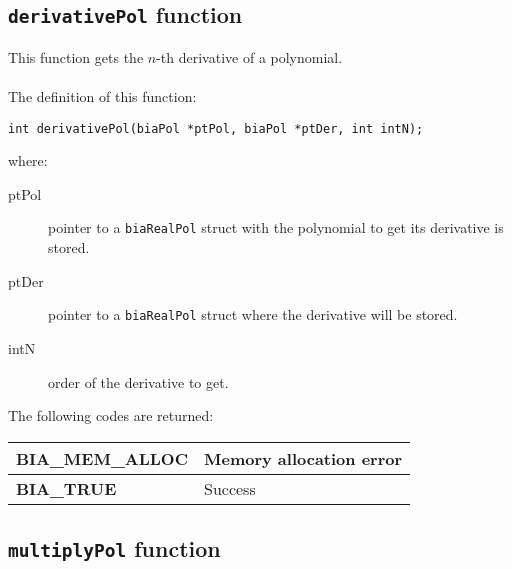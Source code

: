 \subsection{\texttt{derivativePol} function}

This function gets the $n$-th derivative of a polynomial.\\ \\
%
The definition of this function:
%
\begin{verbatim}
int derivativePol(biaPol *ptPol, biaPol *ptDer, int intN);
\end{verbatim}
%
where:
\begin{description} 
\item[ptPol] pointer to a \texttt{biaRealPol} struct with the polynomial to get its derivative is stored.
\item[ptDer] pointer to a \texttt{biaRealPol} struct where the derivative will be stored.
\item[intN] order of the derivative to get.
\end{description}
%
The following codes are returned:
%
\begin{center}
\begin{tabular}{|l|l|}
\hline
\textbf{BIA\_MEM\_ALLOC} & Memory allocation error \\
\hline
\textbf{BIA\_TRUE} & Success \\
\hline
\end{tabular}
\end{center}
%
%

\subsection{\texttt{multiplyPol} function}

